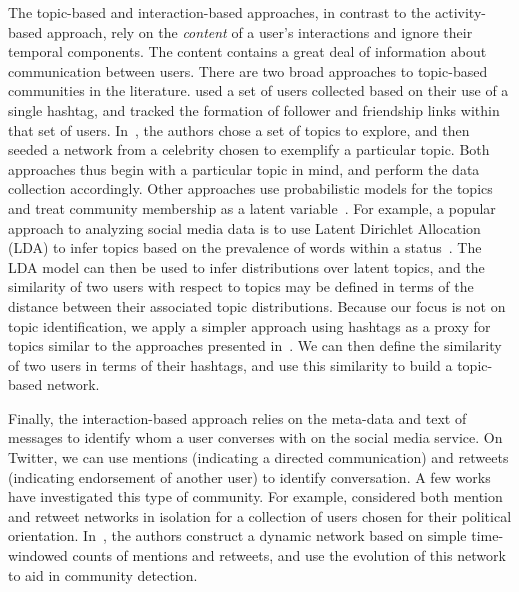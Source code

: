 The topic-based and interaction-based approaches, in contrast to the activity-based approach, rely on the \emph{content} of a user's interactions and ignore their temporal components. The content contains a great deal of information about communication between users.
There are two broad approaches to topic-based communities in the literature. \cite{rossi2012conversation} used a set of users collected based on their use of a single hashtag, and tracked the formation of follower and friendship links within that set of users. In~\cite{lim2012following}, the authors chose a set of topics to explore, and then seeded a network from a celebrity chosen to exemplify a particular topic. Both approaches thus begin with a particular topic in mind, and perform the data collection accordingly. Other approaches use probabilistic models for the topics and treat community membership as a latent variable~\cite{yin2012latent}.
For example, a popular approach to analyzing social media data is to use Latent Dirichlet Allocation (LDA) to infer topics based on the prevalence of words within a status~\cite{zhao2011comparing,michelson2010discovering}. The LDA model can then be used to infer distributions over latent topics, and the similarity of two users with respect to topics may be defined in terms of the distance between their associated topic distributions. Because our focus is not on topic identification, we apply a simpler approach using hashtags as a proxy for topics similar to the approaches presented in~\cite{becker2011beyond,tsur2012s}. We can then define the similarity of two users in terms of their hashtags, and use this similarity to build a topic-based network.

Finally, the interaction-based approach relies on the meta-data and text of messages to identify whom a user converses with on the social media service. On Twitter, we can use mentions (indicating a directed communication) and retweets (indicating endorsement of another user) to identify conversation. 
A few works have investigated this type of community. For example, \cite{conover2011political} considered both mention and retweet networks in isolation for a collection of users chosen for their political orientation. In~\cite{deitrick2013mutually}, the authors construct a dynamic network based on simple time-windowed counts of mentions and retweets, and use the evolution of this network to aid in community detection.

